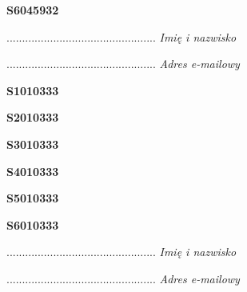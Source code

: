 \begin{turn}{90}\huge \textbf{S6045932}\end{turn}

\begin{turn}{90}\begin{minipage}{\linewidth} \vspace{20mm} ................................................  \textit{Imię i nazwisko}\end{minipage}\end{turn}

\begin{turn}{90}\begin{minipage}{\linewidth} \vspace{20mm} ................................................  \textit{Adres e-mailowy}\end{minipage}\end{turn}

\begin{turn}{90}\huge \textbf{S1010333}\end{turn}

\begin{turn}{90}\huge \textbf{S2010333}\end{turn}

\begin{turn}{90}\huge \textbf{S3010333}\end{turn}

\begin{turn}{90}\huge \textbf{S4010333}\end{turn}

\begin{turn}{90}\huge \textbf{S5010333}\end{turn}

\begin{turn}{90}\huge \textbf{S6010333}\end{turn}

\begin{turn}{90}\begin{minipage}{\linewidth} \vspace{20mm} ................................................  \textit{Imię i nazwisko}\end{minipage}\end{turn}

\begin{turn}{90}\begin{minipage}{\linewidth} \vspace{20mm} ................................................  \textit{Adres e-mailowy}\end{minipage}\end{turn}

